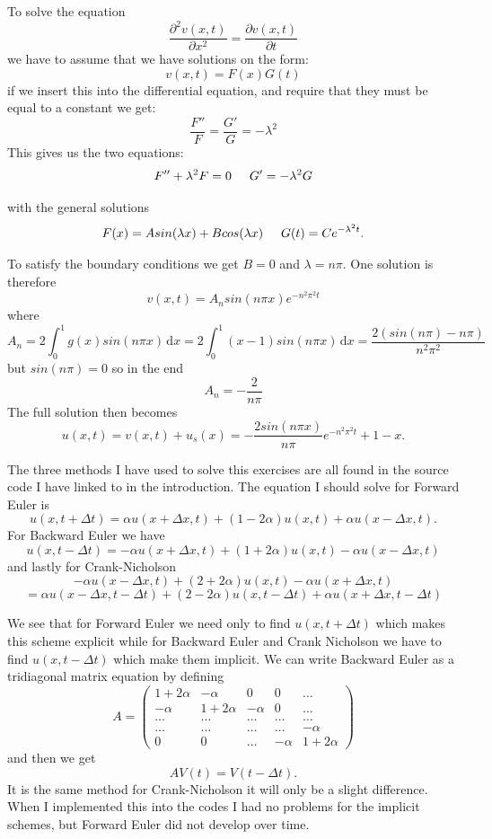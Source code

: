 \documentclass[a4wide,12pt]{article}
\begin{document}
To solve the equation
\[
 \frac{\partial^2 v(x,t)}{\partial x^2} =\frac{\partial v(x,t)}{\partial t}
\]
we have to assume that we have solutions on the form:
\[
v(x,t) = F(x)G(t)
\]
if we insert this into the differential equation, and require that they must be equal to a constant we get:
\[
 \frac{F''}{F} = \frac{G'}{G} = -\lambda^{2}
\]
This gives us the two equations:
\[
F'' + \lambda^{2}F = 0 \hspace{0.5cm} G' = -\lambda^{2}G
\]

with the general solutions
\[
F(x) = A sin(\lambda x) + B cos(\lambda x) \hspace{0.5cm} G(t) = Ce^{-\lambda^{2} t}.
\]

To satisfy the boundary conditions we get $B = 0$ and $\lambda = n\pi$. One solution is therefore
\[
v(x,t) = A_{n}sin(n\pi x)e^{-n^{2}\pi^{2}t}
\]
where 
\[
A_{n} = 2\int_{0}^{1} \! g(x)sin(n\pi x) \, \mathrm{d}x = 2\int_{0}^{1} \! (x-1)sin(n\pi x) \, \mathrm{d}x = \frac{2(sin(n\pi)-n\pi)}{n^{2}\pi^{2}}
\]
but $sin(n\pi) = 0$ so in the end
\[
A_{n} = -\frac{2}{n\pi}
\]
The full solution then becomes
\[
u(x,t) = v(x,t) + u_{s}(x) = -\frac{2sin(n\pi x)}{n\pi}e^{-n^{2}\pi^{2}t} + 1 - x. 
\]

The three methods I have used to solve this exercises are all found in the source code I have linked to in the introduction. 
The equation I should solve for Forward Euler is
\[
u(x,t+\Delta t) = \alpha u(x+\Delta x,t) + (1-2\alpha)u(x,t) + \alpha u(x-\Delta x,t).
\]
For Backward Euler we have
\[
u(x,t-\Delta t) = -\alpha u(x+\Delta x,t) + (1+2\alpha)u(x,t) - \alpha u(x-\Delta x, t)
\]
and lastly for Crank-Nicholson
\[
-\alpha u(x-\Delta x,t) + (2+2\alpha)u(x,t) - \alpha u(x+\Delta x,t) \]
\[ = \alpha u(x-\Delta x,t-\Delta t) + (2-2\alpha)u(x,t-\Delta t) + \alpha u(x+\Delta x,t-\Delta t) \]


We see that for Forward Euler we need only to find $u(x,t+\Delta t)$ which makes this scheme explicit while for Backward Euler and Crank Nicholson we have to find $u(x,t-\Delta t)$ which make them implicit. We can write Backward Euler as a tridiagonal matrix equation by defining 
\[A = \left( \begin{array}{ccccc}
1 + 2\alpha & -\alpha & 0 & 0 & \ldots \\
-\alpha & 1+2\alpha & -\alpha & 0 & \ldots \\
\ldots & \ldots & \ldots & \ldots & \ldots \\
\ldots & \ldots & \ldots & \ldots & -\alpha \\
0 & 0 & \ldots & -\alpha & 1+2\alpha \end{array} \right)\]
and then we get
\[
AV(t) = V(t-\Delta t).
\]
It is the same method for Crank-Nicholson it will only be a slight difference. When I implemented this into the codes 
I had no problems for the implicit schemes, but Forward Euler did not develop over time. 
\end{document}
